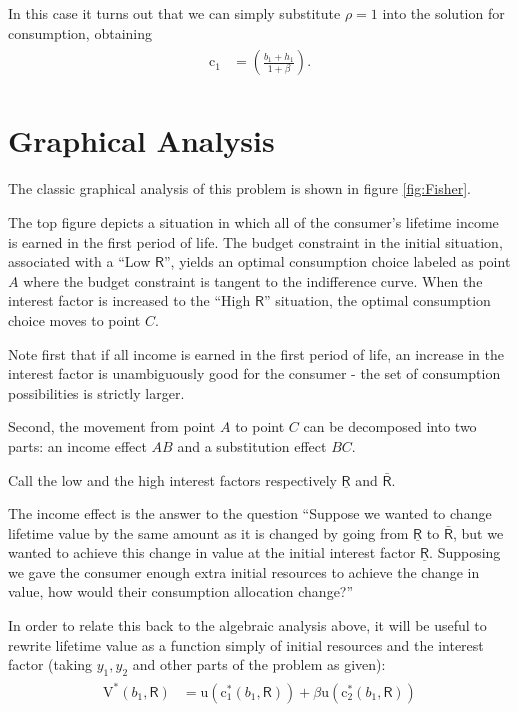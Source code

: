 \documentclass{scrartcl}
\begin{document}
  In this case it turns out that we can simply substitute $\rho=1$ into the solution for consumption, obtaining
  \begin{equation}\begin{gathered}\begin{aligned} \mathrm{c}_{1} & = \left(\frac{\boldsymbol{\mathit{b}}_{1}+\boldsymbol{\mathit{h}}_{1}}{1+\beta}\right).
      \end{aligned}\end{gathered}\end{equation}


  \section{Graphical Analysis}

  The classic graphical analysis of this problem is shown in figure \ref{fig:Fisher}.

  The top figure depicts a situation in which all of the consumer's lifetime income is earned in the first period of life.
  The budget constraint in the initial situation, associated with a ``Low $\mathsf{R}$'', yields an optimal consumption choice labeled as point $A$ where the budget constraint is tangent to the indifference curve.
  When the interest factor is increased to the ``High $\mathsf{R}$'' situation, the optimal consumption choice moves to point $C$.

  Note first that if all income is earned in the first period of life, an increase in the interest factor is unambiguously good for the consumer - the set of consumption possibilities is strictly larger.

  Second, the movement from point $A$ to point $C$ can be decomposed into two parts: an income effect $AB$ and a substitution effect $BC$.

  Call the low and the high interest factors respectively $\underline{\mathsf{R}}$ and $\bar{\mathsf{R}}$.

  The income effect is the answer to the question ``Suppose we wanted to change lifetime value by the same amount as it is changed by going from $\underline{\mathsf{R}}$ to $\bar{\mathsf{R}}$, but we wanted to achieve this change in value at the initial interest factor $\underline{\mathsf{R}}$.
  Supposing we gave the consumer enough extra initial resources to achieve the change in value, how would their consumption allocation change?''

  In order to relate this back to the algebraic analysis above, it will be useful to rewrite lifetime value as a function simply of initial resources and the interest factor (taking ${\boldsymbol{\mathit{y}}_{1},\boldsymbol{\mathit{y}}_{2}}$ and other parts of the problem as given):
  \begin{equation}\begin{gathered}\begin{aligned} \mathrm{V}^{*}(\boldsymbol{\mathit{b}}_{1},\mathsf{R}) & = \mathrm{u}(\mathrm{c}_{1}^{*}(\boldsymbol{\mathit{b}}_{1},\mathsf{R}))+\beta \mathrm{u}(\mathrm{c}_{2}^{*}(\boldsymbol{\mathit{b}}_{1},\mathsf{R}))
      \end{aligned}\end{gathered}\end{equation}
\end{document}
